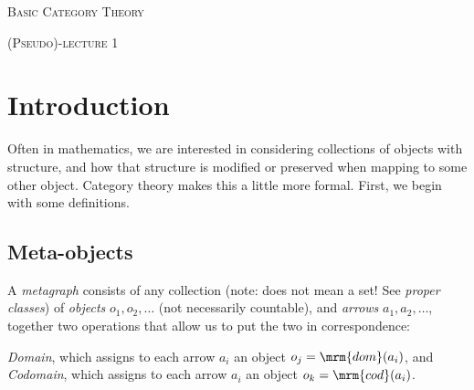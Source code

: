 \documentclass[nocover]{pset}
\begin{document}
\pagestyle{fancy}
\fancyhf{}
\setlength{\headheight}{15.2pt}
\setlength{\headsep}{10pt}


\begin{center}
  {\scshape \LARGE Basic Category Theory}

  {\scshape (Pseudo)-lecture 1}
\end{center}
\hrulefill

\section*{Introduction}
Often in mathematics, we are interested in considering collections of
objects with structure, and how that structure is modified or
preserved when mapping to some other object. Category theory makes
this a little more formal. First, we begin with some definitions.\\

\subsection*{Meta-objects}
\begin{definition}[Metagraph]
  A \emph{metagraph} consists of any collection (note: does not mean a
  set! See \emph{proper classes}) of \emph{objects} $o_1, o_2,
  \ldots$ (not necessarily countable), and \emph{arrows} $a_1, a_2,
  \ldots$, together two operations that allow us to put the two in
  correspondence:\\
\end{definition}
\begin{definition}
  \emph{Domain}, which assigns to each arrow $a_i$ an object $o_j =
  \mrm{dom}(a_i)$, and \emph{Codomain}, which assigns to each arrow
  $a_i$ an object $o_k = \mrm{cod}(a_i)$.
\end{definition}
\end{document}
